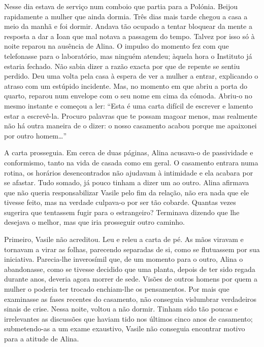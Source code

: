 Nesse dia estava de serviço num comboio que partia para a Polónia.
Beijou rapidamente a mulher que ainda dormia. Três dias mais tarde
chegou a casa a meio da manhã e foi dormir. Andava tão ocupado a tentar
bloquear da mente a resposta a dar a Ioan que mal notava a passagem do
tempo. Talvez por isso só à noite reparou na ausência de Alina. O
impulso do momento fez com que telefonasse para o laboratório, mas
ninguém atendeu; àquela hora o Instituto já estaria fechado. Não sabia
dizer a razão exacta por que de repente se sentiu perdido. Deu uma volta
pela casa à espera de ver a mulher a entrar, explicando o atraso com um
estúpido incidente. Mas, no momento em que abriu a porta do quarto,
reparou num
envelope com o seu nome em cima da cómoda. Abriu-o no mesmo instante e
começou a ler: ``Esta é uma carta difícil de escrever e lamento estar a
escrevê-la. Procuro palavras que te possam magoar menos, mas realmente
não há outra maneira de o dizer: o nosso casamento acabou porque me
apaixonei por outro homem\ldots{}''

A carta prosseguia. Em cerca de duas páginas, Alina acusava-o de
passividade e conformismo, tanto na vida de casada como em geral. O
casamento entrara numa rotina, os horários desencontrados não ajudavam à
intimidade e ela acabara por se afastar. Tudo somado, já pouco tinham a
dizer um ao outro. Alina afirmava que não queria responsabilizar
Vasile pelo fim da relação, não era nada que ele tivesse feito, mas na
verdade culpava-o por ser tão cobarde. Quantas vezes sugerira que
tentassem fugir para o estrangeiro? Terminava dizendo que lhe desejava o
melhor, mas que iria prosseguir outro caminho.

Primeiro, Vasile não acreditou. Leu e releu a carta de pé. As mãos
viravam e tornavam a virar as folhas, parecendo separadas de si, como se
flutuassem por sua iniciativa. Parecia-lhe inverosímil que, de um
momento para o outro, Alina o abandonasse, como se tivesse decidido que
uma planta, depois de ter sido regada durante anos, deveria agora morrer
de sede. Visões de outros homens por quem a mulher o poderia ter trocado
enchiam-lhe os pensamentos. Por mais que examinasse as fases recentes
do casamento, não conseguia vislumbrar verdadeiros sinais de crise.
Nessa noite, voltou a não dormir. Tinham sido tão poucas e irrelevantes
as discussões que haviam tido nos últimos cinco anos de casamento;
submetendo-as a um
exame exaustivo, Vasile não conseguia encontrar motivo para a atitude de
Alina.

